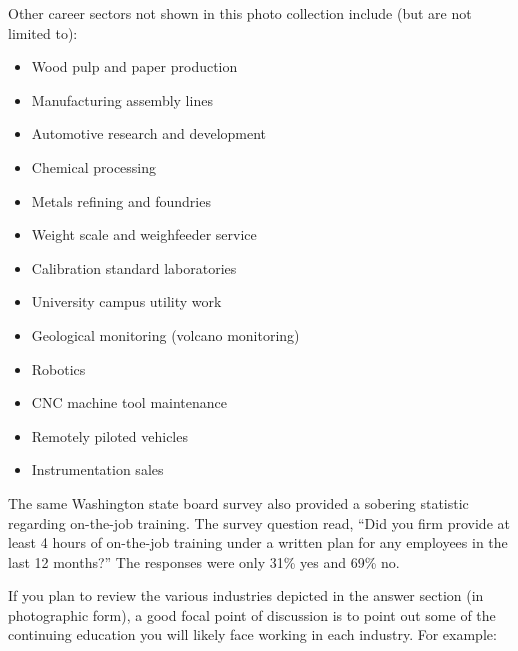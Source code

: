 Other career sectors not shown in this photo collection include (but are not limited to):

\begin{itemize}
\item{} Wood pulp and paper production
\item{} Manufacturing assembly lines
\item{} Automotive research and development
\item{} Chemical processing
\item{} Metals refining and foundries
\item{} Weight scale and weighfeeder service
\item{} Calibration standard laboratories
\item{} University campus utility work
\item{} Geological monitoring (volcano monitoring)
\item{} Robotics
\item{} CNC machine tool maintenance
\item{} Remotely piloted vehicles
\item{} Instrumentation sales
\end{itemize}







The same Washington state board survey also provided a sobering statistic regarding on-the-job training.  The survey question read, ``Did you firm provide at least 4 hours of on-the-job training under a written plan for any employees in the last 12 months?''  The responses were only 31\% yes and 69\% no.

\vskip 10pt

If you plan to review the various industries depicted in the answer section (in photographic form), a good focal point of discussion is to point out some of the continuing education you will likely face working in each industry.  For example:

